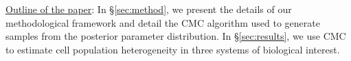 \underline{Outline of the paper}: In \S \ref{sec:method}, we present the details of our methodological framework and detail the CMC algorithm used to generate samples from the posterior parameter distribution. In \S \ref{sec:results}, we use CMC to estimate cell population heterogeneity in three systems of biological interest.


